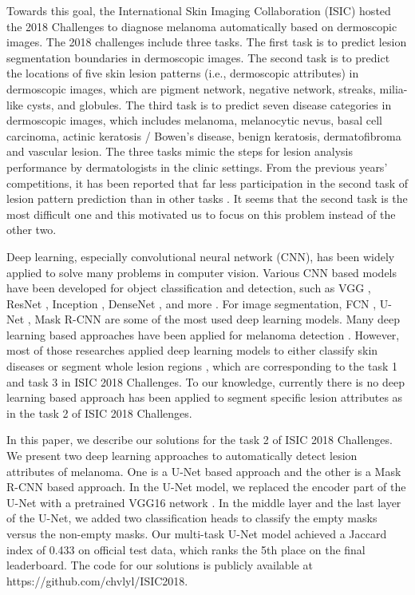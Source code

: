 \documentclass{article}
\begin{document}
Towards this goal, the International Skin Imaging Collaboration (ISIC) hosted the 2018 Challenges to diagnose melanoma automatically based on dermoscopic images. The 2018 challenges include three tasks. The first task is to predict lesion segmentation boundaries in dermoscopic images. The second task is to predict the locations of five skin lesion patterns (i.e., dermoscopic attributes) in dermoscopic images, which are pigment network, negative network, streaks, milia-like cysts, and globules. The third task is to predict seven disease categories in dermoscopic images, which includes melanoma, melanocytic nevus, basal cell carcinoma, actinic keratosis / Bowen’s disease, benign keratosis, dermatofibroma and vascular lesion. The three tasks mimic the steps for lesion analysis performance by dermatologists in the clinic settings.  From the previous years' competitions, it has been reported that far less participation in the second task of lesion pattern prediction than in other tasks \citep{codella2018skin}. It seems that the second task is the most difficult one and this motivated us to focus on this problem instead of the other two. 

Deep learning, especially convolutional neural network (CNN), has been widely applied to solve many problems in computer vision. Various CNN based models have been developed for object classification and detection, such as VGG \citep{simonyan2014very}, ResNet \citep{he2016deep}, Inception \citep{szegedy2017inception}, DenseNet \citep{huang2017densely}, and more \citep{liu2017survey}. For image segmentation, FCN \citep{long2015fully}, U-Net \citep{ronneberger2015u}, Mask R-CNN \citep{he2017mask} are some of the most used deep learning models.  Many deep learning based approaches have been applied for melanoma detection \citep{mishra2016overview}. However, most of those researches applied deep learning models to either classify skin diseases \citep{haenssle2018man, yu2018acral} or segment whole lesion regions \citep{zhang2017melanoma}, which are corresponding to the task 1 and task 3 in ISIC 2018 Challenges. To our knowledge, currently there is no deep learning based approach has been applied to segment specific lesion attributes as in the task 2 of ISIC 2018 Challenges. 

In this paper, we describe our solutions for the task 2 of ISIC 2018 Challenges. We present two deep learning approaches to automatically detect lesion attributes of melanoma. One is a U-Net based approach and the other is a Mask R-CNN based approach. In the U-Net model, we replaced the encoder part of the U-Net with a pretrained VGG16 network \citep{shvets2018automatic}. In the middle layer and the last layer of the U-Net, we added two classification heads to classify the empty masks versus the non-empty masks.  Our multi-task U-Net model achieved a Jaccard index of 0.433 on official test data, which ranks the 5th place on the final leaderboard. The code for our solutions is publicly available at https://github.com/chvlyl/ISIC2018. 
\end{document}
